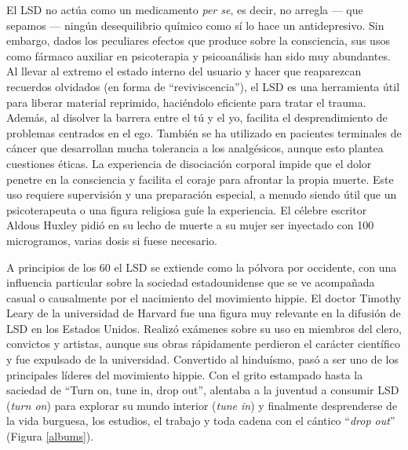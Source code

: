 El LSD no actúa como un medicamento \textit{per se}, es decir, no arregla --- que sepamos --- ningún desequilibrio químico como sí lo hace un antidepresivo. Sin embargo, dados los peculiares efectos que produce sobre la consciencia, sus usos como fármaco auxiliar en psicoterapia y psicoanálisis han sido muy abundantes. Al llevar al extremo el estado interno del usuario y hacer que reaparezcan recuerdos olvidados (en forma de \enquote{reviviscencia}), el LSD es una herramienta útil para liberar material reprimido, haciéndolo eficiente para tratar el trauma. Además, al disolver la barrera entre el tú y el yo, facilita el desprendimiento de problemas centrados en el ego. También se ha utilizado en pacientes terminales de cáncer que desarrollan mucha tolerancia a los analgésicos, aunque esto plantea cuestiones éticas. La experiencia de disociación corporal impide que el dolor penetre en la consciencia y facilita el coraje para afrontar la propia muerte. Este uso requiere supervisión y una preparación especial, a menudo siendo útil que un psicoterapeuta o una figura religiosa guíe la experiencia. El célebre escritor Aldous Huxley pidió en su lecho de muerte a su mujer ser inyectado con 100 microgramos, varias dosis si fuese necesario.

A principios de los 60 el LSD se extiende como la pólvora por occidente, con una influencia particular sobre la sociedad estadounidense que se ve acompañada casual o causalmente por el nacimiento del movimiento hippie. El doctor Timothy Leary de la universidad de Harvard fue una figura muy relevante en la difusión de LSD en los Estados Unidos. Realizó exámenes sobre su uso en miembros del clero, convictos y artistas, aunque sus obras rápidamente perdieron el carácter científico y fue expulsado de la universidad. Convertido al hinduísmo, pasó a ser uno de los principales líderes del movimiento hippie. Con el grito estampado hasta la saciedad de \enquote{Turn on, tune in, drop out}, alentaba a la juventud a consumir LSD (\textit{turn on}) para explorar su mundo interior (\textit{tune in}) y finalmente desprenderse de la vida burguesa, los estudios, el trabajo y toda cadena con el cántico \enquote{\textit{drop out}} (Figura \ref{albums}).

